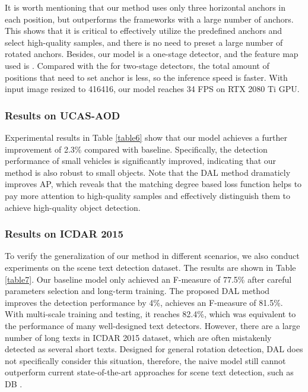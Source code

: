 \documentclass[letterpaper]{article} \usepackage{aaai21}  \usepackage{times}  \usepackage{helvet} \usepackage{courier}  \usepackage[hyphens]{url}  \usepackage{graphicx} \urlstyle{rm} \def\UrlFont{\rm}  \usepackage{natbib}  \usepackage{caption} \frenchspacing  \setlength{\pdfpagewidth}{8.5in}  \setlength{\pdfpageheight}{11in}  \usepackage{url}
\begin{document}
It is worth mentioning that our method uses only three horizontal anchors in each position, but outperforms the frameworks with a large number of anchors. This shows that it is critical to effectively utilize the predefined anchors and select high-quality samples, and there is no need to preset a large number of rotated anchors. Besides, our model is a one-stage detector, and the feature map used is . Compared with the  for two-stage detectors, the total amount of positions that need to set anchor is less, so the inference speed is faster. With input image resized to 416416, our model reaches 34 FPS on RTX 2080 Ti GPU.

\subsubsection{Results on UCAS-AOD}
Experimental results in Table \ref{table6} show that our model achieves a further improvement of 2.3\% compared with baseline. Specifically, the detection performance of small vehicles is significantly improved, indicating that our method is also robust to small objects. Note that the DAL method dramaticly improves AP, which reveals that the matching degree based loss function helps to pay more attention to high-quality samples and effectively distinguish them to achieve high-quality object detection. 

\subsubsection{Results on ICDAR 2015}
To verify the generalization of our method in different scenarios, we also conduct experiments on the scene text detection dataset. The results are shown in Table \ref{table7}. Our baseline model only achieved an F-measure of 77.5\% after careful parameters selection and long-term training. The proposed DAL method improves the detection performance by 4\%, achieves an F-measure of 81.5\%. With multi-scale training and testing, it reaches 82.4\%, which was equivalent to the performance of many well-designed text detectors. However, there are a large number of long texts in ICDAR 2015 dataset, which are often mistakenly detected as several short texts. Designed for general rotation detection, DAL does not specifically consider this situation, therefore, the naive model still cannot outperform current state-of-the-art approaches for scene text detection, such as  DB \cite{liao2020real}.
\end{document}
